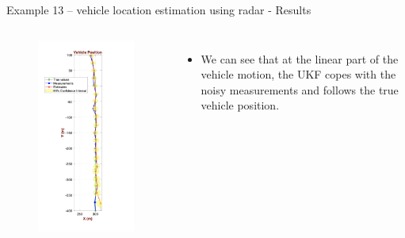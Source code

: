 \begin{frame}{Example 13 – vehicle location estimation using radar - Results}
\begin{columns}
        \vspace{-10pt}
        \begin{figure}
            \centering
            \includegraphics[trim={0 1.7cm 0 1.5cm},clip, width=0.6\linewidth]{Figures//Part3/Ex13_ZoomedPosition_StraightSegment.png}
        \end{figure}
        \begin{itemize}
            \item We can see that at the linear part of the vehicle motion, the UKF copes with the noisy measurements and follows the true vehicle position.
        \end{itemize}
            
        \vspace{-30pt}
        

\end{columns}
\end{frame}
